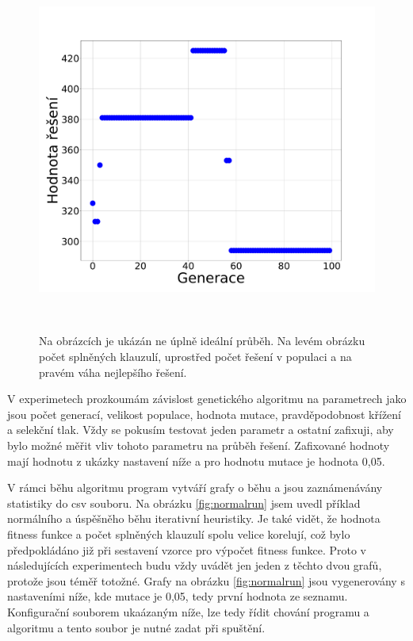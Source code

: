 \documentclass[11pt]{article}
\begin{document}
\begin{figure}
\begin{minipage}[c]{0.325\textwidth}
    \end{minipage}
    \begin{minipage}[c]{0.325\textwidth}
        \centering \includegraphics[width=\textwidth]{img/badW.pdf} 
    \end{minipage}
    \\
   \caption{Na obrázcích je ukázán ne úplně ideální průběh. Na levém obrázku počet splněných klauzulí, uprostřed počet řešení v populaci a na pravém váha nejlepšího řešení.}\label{fig:badrun}
\end{figure} 


V experimetech prozkoumám závislost genetického algoritmu na parametrech jako jsou počet generací, velikost populace, hodnota mutace, pravděpodobnost křížení a selekční tlak. Vždy se pokusím testovat jeden parametr a ostatní zafixuji, aby bylo možné měřit vliv tohoto parametru na průběh řešení. Zafixované hodnoty mají hodnotu z ukázky nastavení níže a pro hodnotu mutace je hodnota 0,05.

V rámci běhu algoritmu program vytváří grafy o běhu a jsou zaznámenávány statistiky do csv souboru. Na obrázku \ref{fig:normalrun} jsem uvedl příklad normálního a úspěšněho běhu iterativní heuristiky. Je také vidět, že hodnota fitness funkce a počet splněných klauzulí spolu velice korelují, což bylo předpokládáno již při sestavení vzorce pro výpočet fitness funkce. Proto v následujících experimentech budu vždy uvádět jen jeden z těchto dvou grafů, protože jsou téměř totožné. Grafy na obrázku \ref{fig:normalrun} jsou vygenerovány s nastaveními níže, kde mutace je 0,05, tedy první hodnota ze seznamu. Konfigurační souborem ukaázaným níže, lze tedy řídit chování programu a algoritmu a tento soubor je nutné zadat při spuštění.
\end{document}
